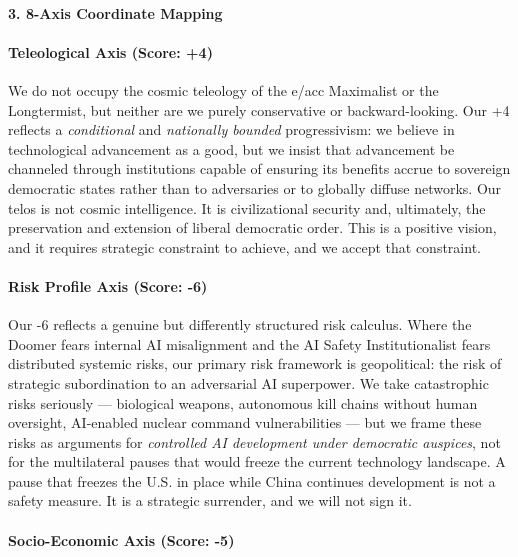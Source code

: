 \paragraph{3. 8-Axis Coordinate
Mapping}\label{axis-coordinate-mapping-21}

\paragraph{Teleological Axis (Score:
+4)}\label{teleological-axis-score-4-2}

We do not occupy the cosmic teleology of the e/acc Maximalist or the
Longtermist, but neither are we purely conservative or backward-looking.
Our +4 reflects a \emph{conditional} and \emph{nationally bounded}
progressivism: we believe in technological advancement as a good, but we
insist that advancement be channeled through institutions capable of
ensuring its benefits accrue to sovereign democratic states rather than
to adversaries or to globally diffuse networks. Our telos is not cosmic
intelligence. It is civilizational security and, ultimately, the
preservation and extension of liberal democratic order. This is a
positive vision, and it requires strategic constraint to achieve, and we
accept that constraint.

\paragraph{Risk Profile Axis (Score:
-6)}\label{risk-profile-axis-score--6}

Our -6 reflects a genuine but differently structured risk calculus.
Where the Doomer fears internal AI misalignment and the AI Safety
Institutionalist fears distributed systemic risks, our primary risk
framework is geopolitical: the risk of strategic subordination to an
adversarial AI superpower. We take catastrophic risks seriously ---
biological weapons, autonomous kill chains without human oversight,
AI-enabled nuclear command vulnerabilities --- but we frame these risks
as arguments for \emph{controlled AI development under democratic
auspices}, not for the multilateral pauses that would freeze the current
technology landscape. A pause that freezes the U.S. in place while China
continues development is not a safety measure. It is a strategic
surrender, and we will not sign it.

\paragraph{Socio-Economic Axis (Score:
-5)}\label{socio-economic-axis-score--5}


